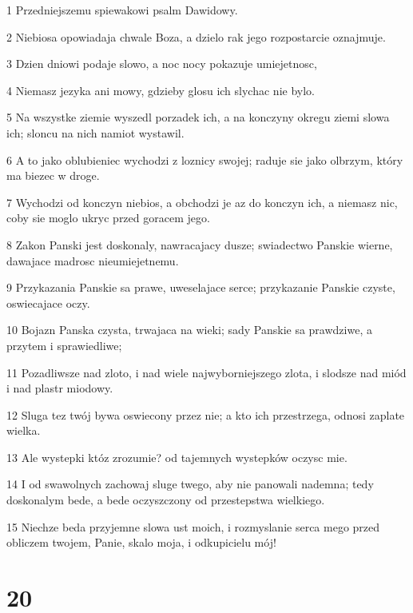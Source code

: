 \par 1 Przedniejszemu spiewakowi psalm Dawidowy.
\par 2 Niebiosa opowiadaja chwale Boza, a dzielo rak jego rozpostarcie oznajmuje.
\par 3 Dzien dniowi podaje slowo, a noc nocy pokazuje umiejetnosc,
\par 4 Niemasz jezyka ani mowy, gdzieby glosu ich slychac nie bylo.
\par 5 Na wszystke ziemie wyszedl porzadek ich, a na konczyny okregu ziemi slowa ich; sloncu na nich namiot wystawil.
\par 6 A to jako oblubieniec wychodzi z loznicy swojej; raduje sie jako olbrzym, który ma biezec w droge.
\par 7 Wychodzi od konczyn niebios, a obchodzi je az do konczyn ich, a niemasz nic, coby sie moglo ukryc przed goracem jego.
\par 8 Zakon Panski jest doskonaly, nawracajacy dusze; swiadectwo Panskie wierne, dawajace madrosc nieumiejetnemu.
\par 9 Przykazania Panskie sa prawe, uweselajace serce; przykazanie Panskie czyste, oswiecajace oczy.
\par 10 Bojazn Panska czysta, trwajaca na wieki; sady Panskie sa prawdziwe, a przytem i sprawiedliwe;
\par 11 Pozadliwsze nad zloto, i nad wiele najwyborniejszego zlota, i slodsze nad miód i nad plastr miodowy.
\par 12 Sluga tez twój bywa oswiecony przez nie; a kto ich przestrzega, odnosi zaplate wielka.
\par 13 Ale wystepki któz zrozumie? od tajemnych wystepków oczysc mie.
\par 14 I od swawolnych zachowaj sluge twego, aby nie panowali nademna; tedy doskonalym bede, a bede oczyszczony od przestepstwa wielkiego.
\par 15 Niechze beda przyjemne slowa ust moich, i rozmyslanie serca mego przed obliczem twojem, Panie, skalo moja, i odkupicielu mój!

\chapter{20}

